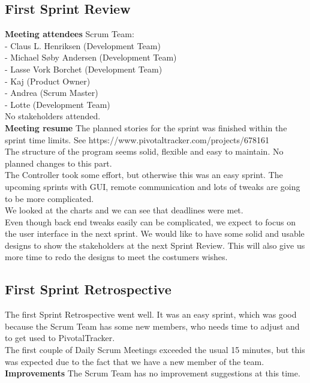 \subsection{First Sprint Review}
\textbf{Meeting attendees}
Scrum Team:\\
- Claus L. Henriksen (Development Team)\\
- Michael Søby Andersen (Development Team)\\
- Lasse Vork Borchet (Development Team)\\
- Kaj (Product Owner)\\
- Andrea (Scrum Master)\\
- Lotte (Development Team)\\
No stakeholders attended.\\

\textbf{Meeting resume}
The planned stories for the sprint was finished within the sprint time limits. See https://www.pivotaltracker.com/projects/678161\\
The structure of the program seems solid, flexible and easy to maintain. No planned changes to this part.\\
The Controller took some effort, but otherwise this was an easy sprint. The upcoming sprints with GUI, remote communication and lots of tweaks are going to be more complicated.\\
We looked at the charts and we can see that deadlines were met.\\

Even though back end tweaks easily can be complicated, we expect to focus on the user interface in the next sprint. We would like to have some solid and usable designs to show the stakeholders at the next Sprint Review. This will also give us more time to redo the designs to meet the costumers wishes.\\

\subsection{First Sprint Retrospective}
The first Sprint Retrospective went well. It was an easy sprint, which was good because the Scrum Team has some new members, who needs time to adjust and to get used to PivotalTracker.\\
The first couple of Daily Scrum Meetings exceeded the usual 15 minutes, but this was expected due to the fact that we have a new member of the team.\\
\textbf{Improvements}
The Scrum Team has no improvement suggestions at this time.\\

\newpage